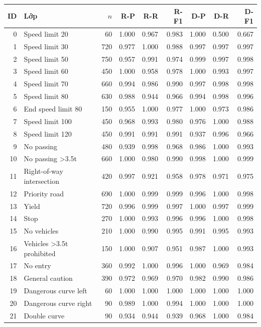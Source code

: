 \begin{tabular}{r p{42mm} r rrr rrr}
\toprule
ID & Lớp & $n$ & R-P & R-R & R-F1 & D-P & D-R & D-F1\\
\midrule
0 & Speed limit 20 & 60 & 1.000 & 0.967 & 0.983 & 1.000 & 0.500 & 0.667\\
1 & Speed limit 30 & 720 & 0.977 & 1.000 & 0.988 & 0.997 & 0.997 & 0.997\\
2 & Speed limit 50 & 750 & 0.957 & 0.991 & 0.974 & 0.999 & 0.997 & 0.998\\
3 & Speed limit 60 & 450 & 1.000 & 0.958 & 0.978 & 1.000 & 0.993 & 0.997\\
4 & Speed limit 70 & 660 & 0.994 & 0.986 & 0.990 & 0.997 & 0.998 & 0.998\\
5 & Speed limit 80 & 630 & 0.988 & 0.944 & 0.966 & 0.994 & 0.998 & 0.996\\
6 & End speed limit 80 & 150 & 0.955 & 1.000 & 0.977 & 1.000 & 0.973 & 0.986\\
7 & Speed limit 100 & 450 & 0.968 & 0.993 & 0.980 & 0.976 & 1.000 & 0.988\\
8 & Speed limit 120 & 450 & 0.991 & 0.991 & 0.991 & 0.937 & 0.996 & 0.966\\
9 & No passing & 480 & 0.939 & 0.998 & 0.968 & 0.986 & 1.000 & 0.993\\
10 & No passing >3.5t & 660 & 1.000 & 0.980 & 0.990 & 0.998 & 1.000 & 0.999\\
11 & Right-of-way intersection & 420 & 0.997 & 0.921 & 0.958 & 0.978 & 0.971 & 0.975\\
12 & Priority road & 690 & 1.000 & 0.999 & 0.999 & 0.996 & 1.000 & 0.998\\
13 & Yield & 720 & 0.996 & 0.999 & 0.997 & 1.000 & 0.997 & 0.999\\
14 & Stop & 270 & 1.000 & 0.993 & 0.996 & 0.996 & 1.000 & 0.998\\
15 & No vehicles & 210 & 1.000 & 0.990 & 0.995 & 0.991 & 0.995 & 0.993\\
16 & Vehicles >3.5t prohibited & 150 & 1.000 & 0.907 & 0.951 & 0.987 & 1.000 & 0.993\\
17 & No entry & 360 & 0.992 & 1.000 & 0.996 & 1.000 & 0.969 & 0.984\\
18 & General caution & 390 & 0.972 & 0.969 & 0.970 & 0.982 & 0.990 & 0.986\\
19 & Dangerous curve left & 60 & 1.000 & 1.000 & 1.000 & 1.000 & 1.000 & 1.000\\
20 & Dangerous curve right & 90 & 0.989 & 1.000 & 0.994 & 1.000 & 1.000 & 1.000\\
21 & Double curve & 90 & 0.934 & 0.944 & 0.939 & 0.968 & 1.000 & 0.984\\
\bottomrule
\end{tabular}
